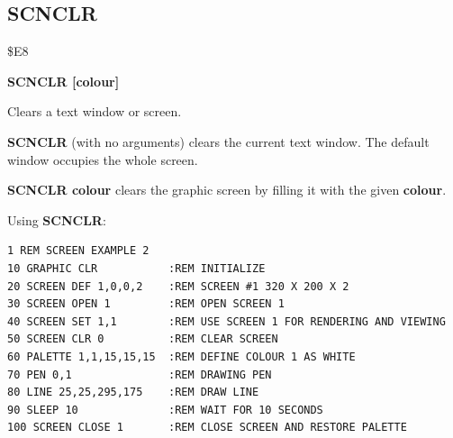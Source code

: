 
\newpage
\subsection{SCNCLR}
\begin{description}[leftmargin=2cm,style=nextline]
\item [Token:] \$E8
\item [Format:] {\bf SCNCLR [colour]}
\item [Usage:] Clears a text window or screen.

               {\bf SCNCLR} (with no arguments) clears the
               current text window. The default window
               occupies the whole screen.

               {\bf SCNCLR colour} clears the graphic screen by
               filling it with the given {\bf colour}.

\item [Example:] Using {\bf SCNCLR}:
\begin{tcolorbox}[colback=black,coltext=white]
\verbatimfont{\codefont}
\begin{verbatim}
1 REM SCREEN EXAMPLE 2
10 GRAPHIC CLR           :REM INITIALIZE
20 SCREEN DEF 1,0,0,2    :REM SCREEN #1 320 X 200 X 2
30 SCREEN OPEN 1         :REM OPEN SCREEN 1
40 SCREEN SET 1,1        :REM USE SCREEN 1 FOR RENDERING AND VIEWING
50 SCREEN CLR 0          :REM CLEAR SCREEN
60 PALETTE 1,1,15,15,15  :REM DEFINE COLOUR 1 AS WHITE
70 PEN 0,1               :REM DRAWING PEN
80 LINE 25,25,295,175    :REM DRAW LINE
90 SLEEP 10              :REM WAIT FOR 10 SECONDS
100 SCREEN CLOSE 1       :REM CLOSE SCREEN AND RESTORE PALETTE
\end{verbatim}
\end{tcolorbox}
\end{description}


\newpage
